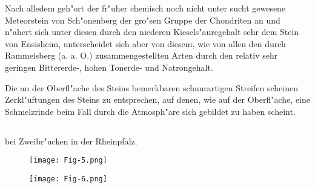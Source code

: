 \documentclass[a4paper, 11pt, oneside]{article}
\begin{document}
Nach alledem geh"ort der fr"uher chemisch noch nicht unter sucht gewesene Meteorstein von Sch"onenberg der gro"sen Gruppe der Chondriten an und n"ahert sich unter diesen durch den niederen Kiesels"auregehalt sehr dem Stein von Ensisheim, unterscheidet sich aber von diesem, wie von allen den durch Rammeisberg (a. a. O.) zusammengestellten Arten durch den relativ sehr geringen Bittererde-, hohen Tonerde- und Natrongehalt.

Die an der Oberfl"ache des Steins bemerkbaren schnurartigen Streifen scheinen Zerkl"uftungen des Steins zu entsprechen, auf denen, wie auf der Oberfl"ache, eine Schmelzrinde beim Fall durch die Atmosph"are sich gebildet zu haben scheint.
\clearpage
\subsection{}
\paragraph{}
bei Zweibr"ucken in der Rheinpfalz.
\begin{figure}[h]
\centering
\texttt{[image: Fig-5.png]}
\caption{}
\end{figure}
\begin{figure}[h]
\centering
\texttt{[image: Fig-6.png]}
\caption{}
\end{figure}
\end{document}
